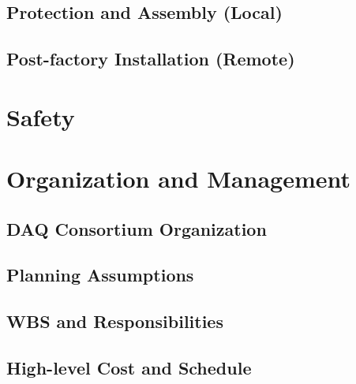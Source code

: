 \subsection{Protection and Assembly (Local)}
\label{sec:fddp-daq-qc-local}


\subsection{Post-factory Installation (Remote)}
\label{sec:fddp-daq-qc-remote}





\section{Safety}
\label{sec:fddp-daq-safety}






\section{Organization and Management}
\label{sec:fddp-daq-org}

\subsection{DAQ Consortium Organization}
\label{sec:fddp-daq-org-consortium}


\subsection{Planning Assumptions}
\label{sec:fddp-daq-org-assmp}


\subsection{WBS and Responsibilities}
\label{sec:fddp-daq-org-wbs}

\subsection{High-level Cost and Schedule}
\label{sec:fddp-daq-org-cs}














